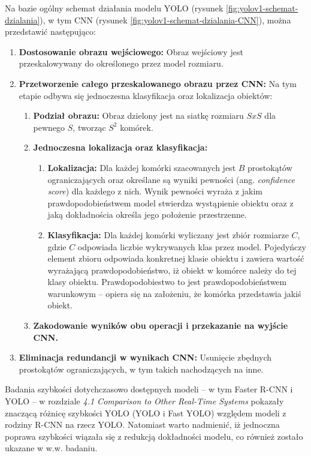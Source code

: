 Na bazie \cite{yolo_pierwszy_artykul} ogólny schemat działania modelu YOLO (rysunek \ref{fig:yolov1-schemat-dzialania}), w tym CNN (rysunek \ref{fig:yolov1-schemat-dzialania-CNN}), można przedstawić następująco:
\begin{enumerate}
    \item \textbf{Dostosowanie obrazu wejściowego:} Obraz wejściowy jest przeskalowywany do określonego przez model rozmiaru.
    \item \textbf{Przetworzenie całego przeskalowanego obrazu przez CNN:} Na tym etapie odbywa się jednoczesna klasyfikacja oraz lokalizacja obiektów:
    \begin{enumerate}
        \item \textbf{Podział obrazu:} Obraz dzielony jest na siatkę rozmiaru $SxS$ dla pewnego $S$, tworząc $S^{2}$ komórek. 
        \item \textbf{Jednoczesna lokalizacja oraz klasyfikacja:} 
        \begin{enumerate}
            \item \textbf{Lokalizacja:} Dla każdej komórki szacowanych jest $B$ prostokątów ograniczających oraz określane są wyniki pewności (ang. \emph{confidence score}) dla każdego z nich. Wynik pewności wyraża z jakim prawdopodobieństwem model stwierdza wystąpienie obiektu oraz z jaką dokładnościa określa jego położenie przestrzenne.
            \item \textbf{Klasyfikacja:} Dla każdej komórki wyliczany jest zbiór rozmiarze $C$, gdzie $C$ odpowiada liczbie wykrywanych klas przez model. Pojedyńczy element zbioru odpowiada konkretnej klasie obiektu i zawiera wartość wyrażającą prawdopodobieństwo, iż obiekt w komórce należy do tej klasy obiektu. Prawdopodobiestwo to jest prawdopodobieństwem warunkowym -- opiera się na założeniu, że komórka przedstawia jakiś obiekt. 
        \end{enumerate}
        \item \textbf{Zakodowanie wyników obu operacji i przekazanie na wyjście CNN.}
    \end{enumerate}
    \item  \textbf{Eliminacja redundancji w wynikach CNN:} Usunięcie zbędnych prostokątów ograniczających, w tym takich nachodzących na inne. 
\end{enumerate}

Badania szybkości dotychczasowo dostępnych modeli -- w tym Faster R-CNN i YOLO -- w rozdziale \emph{4.1 Comparison to Other Real-Time Systems} \cite{yolo_pierwszy_artykul} pokazały znaczącą różnicę szybkości YOLO (YOLO i Fast YOLO) względem modeli z rodziny R-CNN na rzecz YOLO. Natomiast warto nadmienić, iż jednoczna poprawa szybkości wiązała się z redukcją dokładności modelu, co również zostało ukazane w w.w. badaniu.

